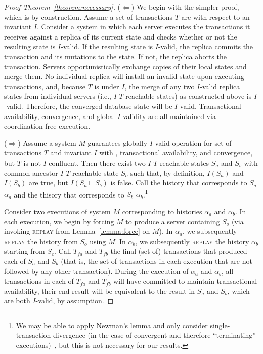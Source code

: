 \begin{proof}[Proof Theorem~\ref{theorem:necessary}]
($\Leftarrow$) We begin with the simpler proof, which is by
  construction. Assume a set of transactions $T$ are \iconfluent with
  respect to an invariant $I$. Consider a system in which each server
  executes the transactions it receives against a replica of its current state and checks whether or not the resulting state is $I$-valid. If
  the resulting state is $I$-valid, the replica commits the
  transaction and its mutations to the state. If not, the replica
  aborts the transaction. Servers opportunistically exchange copies of
  their local states and merge them. No individual replica will
  install an invalid state upon executing transactions, and, because
  $T$ is \iconfluent under $I$, the merge of any two $I$-valid replica
  states from individual servers (i.e., $I$-$T$-reachable states) as
  constructed above is $I$-valid. Therefore, the converged database
  state will be $I$-valid. Transactional availability, convergence,
  and global $I$-validity are all maintained via coordination-free
  execution.

  ($\Rightarrow$) Assume a system $M$ guarantees globally $I$-valid
  operation for set of transactions $T$ and invariant $I$ with
  \cfreedom, transactional availability, and convergence, but $T$ is
  not $I$-confluent. Then there exist two $I$-$T$-reachable states
  $S_a$ and $S_b$ with common ancestor $I$-$T$-reachable state $S_o$
  such that, by definition, $I(S_a)$ and $I(S_b)$ are true, but $I(S_a
  \sqcup S_b)$ is false. Call the history that corresponds to $S_a$
  $\alpha_a$ and the thisory that corresponds to $S_b$
  $\alpha_b$.\footnote{We may be able to apply Newman's lemma and only
    consider single-transaction divergence (in the case of convergent
    and therefore ``terminating''
    executions)~\cite{obs-confluence,termrewriting}, but this is not
    necessary for our results.\label{fn:newman-note}}

  Consider two executions of system $M$ corresponding to histories
  $\alpha_a$ and $\alpha_b$. In each execution, we begin by forcing
  $M$ to produce a server containing $S_o$ (via invoking
  \textsc{replay} from Lemma~\ref{lemma:force} on $M$). In $\alpha_a$, we subsequently
  \textsc{replay} the history from $S_o$ using $M$. In $\alpha_b$, we
  subsequently \textsc{replay} the history $\alpha_b$ starting from
  $S_c$. Call $T_{fa}$ and $T_{fb}$ the final (set of) transactions
  that produced each of $S_a$ and $S_b$ (that is, the set of
  transactions in each execution that are not followed by any other
  transaction). During the execution of $\alpha_a$ and $\alpha_b$, all
  transactions in each of $T_{fa}$ and $T_{fb}$ will have committed to
  maintain transactional availability, their end result will be
  equivalent to the result in $S_a$ and $S_b$, which are both
  $I$-valid, by assumption.


\end{proof}
